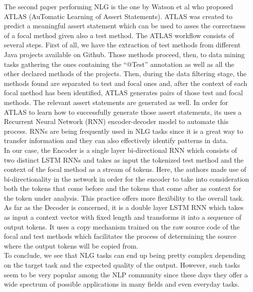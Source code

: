 The second paper performing NLG is the one by Watson et al \cite{9283916} who proposed ATLAS (AuTomatic Learning of Assert Statements). ATLAS was created to predict a meaningful assert statement which can be 
used to asses the correctness of a focal method given also a test method. The ATLAS workflow consists of several steps. First of all, we have the extraction of test methods from different Java projects available 
on Github. Those methods proceed, then, to data mining tasks gathering the ones containing the ``@Test'' annotation as well as all the other declared methods of the projects. Then, during the data filtering 
stage, the methods found are separated to test and focal ones and, after the context of each focal method has been identified, ATLAS generates pairs of those test and focal methods. The relevant assert statements 
are generated as well. In order for ATLAS to learn how to successfully generate those assert statements, its uses a Recurrent Neural Network (RNN) encoder-decoder model to automate this process. RNNs are 
being frequently used in NLG tasks since it is a great way to transfer information and they can also effectively identify patterns in data.\\

In our case, the Encoder is a single layer bi-directional RNN which consists of two distinct LSTM RNNs and takes as input the tokenized test method and the context of the focal method as a stream of tokens. 
Here, the authors made use of bi-directionality in the network in order for the encoder to take into consideration both the tokens that come before and the tokens that come after as context for the token 
under analysis. This practice offers more flexibility to the overall task.\\
As far as the Decoder is concerned, it is a double layer LSTM RNN which takes as input a context vector with fixed length and transforms it into a sequence of output tokens. It uses a copy mechanism trained 
on the raw source code of the focal and test methods which facilitates the process of determining the source where the output tokens will be copied from.\\

To conclude, we see that NLG tasks can end up being pretty complex depending on the target task and the expected quality of the output. However, such tasks seem to be very popular among the NLP community 
since these days they offer a wide spectrum of possible applications in many fields and even everyday tasks.
